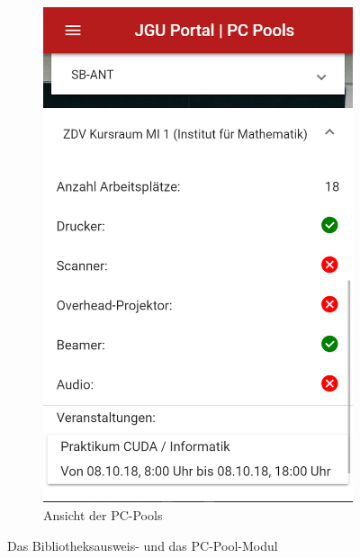 \begin{figure}
\begin{subfigure}{.5\textwidth}
  \centering
  \includegraphics[width=.8\linewidth]{gfx/PC-Pools}
  \caption{Ansicht der PC-Pools}
  \label{fig:Pc-Pools}
\end{subfigure}
\caption{Das Bibliotheksausweis- und das PC-Pool-Modul}
\label{fig:Bib+Pc}
\end{figure}

